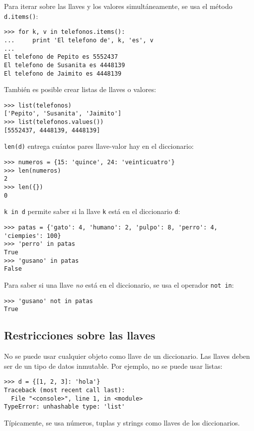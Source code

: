 Para iterar sobre las llaves y los valores simultáneamente, se usa el
método \lstinline!d.items()!:

\begin{lstlisting}
>>> for k, v in telefonos.items():
...     print 'El telefono de', k, 'es', v
...
El telefono de Pepito es 5552437
El telefono de Susanita es 4448139
El telefono de Jaimito es 4448139
\end{lstlisting}

También es posible crear listas de llaves o valores:

\begin{lstlisting}
>>> list(telefonos)
['Pepito', 'Susanita', 'Jaimito']
>>> list(telefonos.values())
[5552437, 4448139, 4448139]
\end{lstlisting}

\lstinline!len(d)! entrega cuántos pares llave-valor hay en el
diccionario:

\begin{lstlisting}
>>> numeros = {15: 'quince', 24: 'veinticuatro'}
>>> len(numeros)
2
>>> len({})
0
\end{lstlisting}

\lstinline!k in d! permite saber si la llave \lstinline!k! está en el
diccionario \lstinline!d!:

\begin{lstlisting}
>>> patas = {'gato': 4, 'humano': 2, 'pulpo': 8, 'perro': 4, 'ciempies': 100}
>>> 'perro' in patas
True
>>> 'gusano' in patas
False
\end{lstlisting}

Para saber si una llave \emph{no} está en el diccionario, se usa el
operador \lstinline!not in!:

\begin{lstlisting}
>>> 'gusano' not in patas
True
\end{lstlisting}

\subsection{Restricciones sobre las llaves}

No se puede usar cualquier objeto como llave de un diccionario. Las
llaves deben ser de un tipo de datos inmutable. Por ejemplo, no se puede
usar listas:

\begin{lstlisting}
>>> d = {[1, 2, 3]: 'hola'}
Traceback (most recent call last):
  File "<console>", line 1, in <module>
TypeError: unhashable type: 'list'
\end{lstlisting}

Típicamente, se usa números, tuplas y strings como llaves de los
diccionarios.
